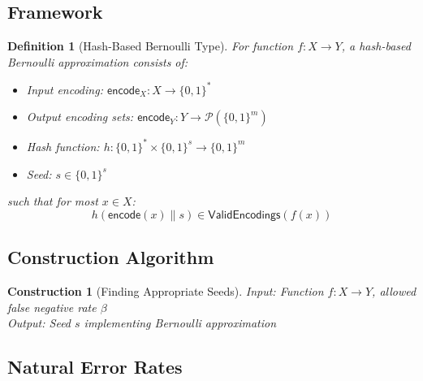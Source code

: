 \documentclass[11pt,final,hidelinks]{article}
\newtheorem{definition}[theorem]{Definition}
\newtheorem{construction}[theorem]{Construction}
\newcommand{\Encode}[1]{\mathsf{encode}(#1)}
\newcommand{\ValidEnc}[1]{\mathsf{ValidEncodings}(#1)}
\begin{document}
\subsection{Framework}

\begin{definition}[Hash-Based Bernoulli Type]
For function $f: X \to Y$, a hash-based Bernoulli approximation consists of:
\begin{itemize}
    \item Input encoding: $\mathsf{encode}_X: X \to \{0,1\}^*$
    \item Output encoding sets: $\mathsf{encode}_Y: Y \to \mathcal{P}(\{0,1\}^m)$
    \item Hash function: $h: \{0,1\}^* \times \{0,1\}^s \to \{0,1\}^m$
    \item Seed: $s \in \{0,1\}^s$
\end{itemize}
such that for most $x \in X$:
\begin{equation}
h(\Encode{x} \| s) \in \ValidEnc{f(x)}
\end{equation}
\end{definition}

\subsection{Construction Algorithm}

\begin{construction}[Finding Appropriate Seeds]
Input: Function $f: X \to Y$, allowed false negative rate $\beta$\\
Output: Seed $s$ implementing Bernoulli approximation
\end{construction}

\begin{algorithm}[H]
\caption{Hash-Based Bernoulli Construction}
\end{algorithm}

\subsection{Natural Error Rates}
\end{document}
